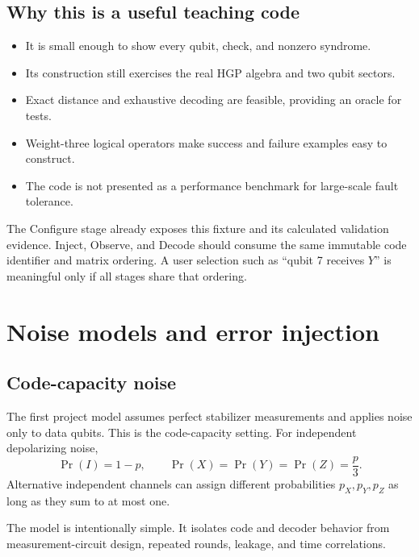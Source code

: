 \documentclass[11pt,letterpaper]{article}
\begin{document}
\subsection{Why this is a useful teaching code}

\begin{itemize}
  \item It is small enough to show every qubit, check, and nonzero syndrome.
  \item Its construction still exercises the real HGP algebra and two qubit sectors.
  \item Exact distance and exhaustive decoding are feasible, providing an oracle for tests.
  \item Weight-three logical operators make success and failure examples easy to construct.
  \item The code is not presented as a performance benchmark for large-scale fault tolerance.
\end{itemize}

\begin{projectbox}
The Configure stage already exposes this fixture and its calculated validation evidence. Inject,
Observe, and Decode should consume the same immutable code identifier and matrix ordering. A user
selection such as ``qubit 7 receives $Y$'' is meaningful only if all stages share that ordering.
\end{projectbox}

\section{Noise models and error injection}

\subsection{Code-capacity noise}

The first project model assumes perfect stabilizer measurements and applies noise only to data
qubits. This is the code-capacity setting. For independent depolarizing noise,
\begin{equation}
  \Pr(I)=1-p,\qquad \Pr(X)=\Pr(Y)=\Pr(Z)=\frac{p}{3}.
  \label{eq:depolarizing}
\end{equation}
Alternative independent channels can assign different probabilities $p_X,p_Y,p_Z$ as long as they
sum to at most one.

The model is intentionally simple. It isolates code and decoder behavior from measurement-circuit
design, repeated rounds, leakage, and time correlations.
\end{document}
